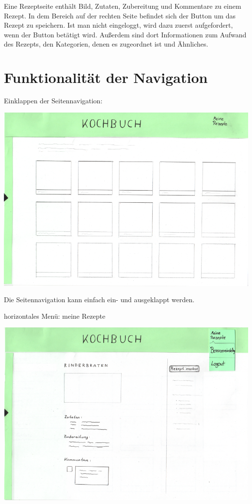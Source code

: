 \documentclass[parskip,10pt,abstracton]{scrartcl}
\begin{document}
Eine Rezeptseite enthält Bild, Zutaten, Zubereitung und Kommentare zu einem Rezept. In dem Bereich auf der rechten Seite befindet sich der Button um das Rezept zu speichern. Ist man nicht eingeloggt, wird dazu zuerst aufgefordert, wenn der Button betätigt wird.
Außerdem sind dort Informationen zum Aufwand des Rezepts, den Kategorien, denen es zugeordnet ist und Ähnliches.

\section*{Funktionalität der Navigation}

Einklappen der Seitennavigation:
\begin{center}
\includegraphics[scale=0.4]{Prototyp/home_menuhidden.png}
\end{center}

Die Seitennavigation kann einfach ein- und ausgeklappt werden.

horizontales Menü: meine Rezepte
\begin{center}
\includegraphics[scale=0.4]{Prototyp/menu_eigeneRezepte_menuhidden.png}
\end{center}
\end{document}
